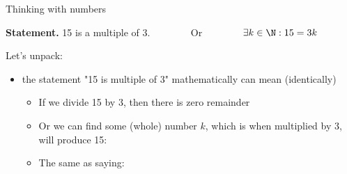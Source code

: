 \documentclass[11pt,aspectratio=1610]{beamer}
\begin{document}
		
\begin{frame}{Thinking with numbers}
	\vspace{-3mm} \p
	\begin{examplen}
		\textbf{Statement.} 15 is a multiple of $3$. \pause ~~~~~~~ Or  ~~~~~~~	$\exists k \in \N : 15=3k$ \pause
	\end{examplen}
	
	Let's unpack: \p 
\begin{itemize}
		\item the statement "15 is multiple of 3" mathematically can mean (identically)
	\begin{itemize}
			\item If we divide 15 by 3, then there is zero remainder \p
			
			\begin{center}
			\end{center}\p
			
			\item Or we can find some (whole) number $k$, which is when multiplied by 3, will produce 15: \p
			
			\begin{center}
			\end{center}\p
			
	\item The same as saying:
	
	\vspace{-4mm}		\p
	
	\vspace{2mm}


	\end{itemize}
\end{itemize}

	
	

\end{frame}
\end{document}
